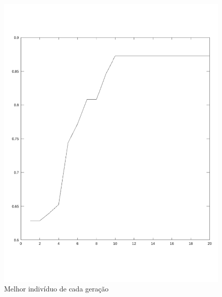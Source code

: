 \documentclass{article}
\begin{document}
\newpage
\begin{figure}[h!]
\centering
\includegraphics[scale=.6]{images/melhorIndividuoACadaGeracao.pdf}
\caption{Melhor indivíduo de cada geração}
\label{fig:melhorIndividuoACadaGeracao}
\end{figure}
\end{document}
